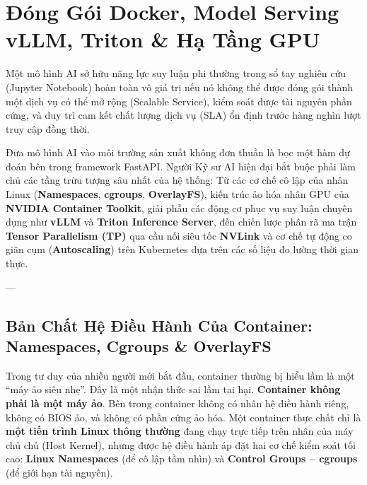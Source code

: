 
\chapter{Đóng Gói Docker, Model Serving vLLM, Triton \& Hạ Tầng GPU}
\label{ch:docker-serving-triton}

Một mô hình AI sở hữu năng lực suy luận phi thường trong sổ tay nghiên cứu (Jupyter Notebook) hoàn toàn vô giá trị nếu nó không thể được đóng gói thành một dịch vụ có thể mở rộng (Scalable Service), kiểm soát được tài nguyên phần cứng, và duy trì cam kết chất lượng dịch vụ (SLA) ổn định trước hàng nghìn lượt truy cập đồng thời.

Đưa mô hình AI vào môi trường sản xuất không đơn thuần là bọc một hàm dự đoán bên trong framework FastAPI. Người Kỹ sư AI hiện đại bắt buộc phải làm chủ các tầng trừu tượng sâu nhất của hệ thống: Từ các cơ chế cô lập của nhân Linux (\textbf{Namespaces}, \textbf{cgroups}, \textbf{OverlayFS}), kiến trúc ảo hóa nhân GPU của \textbf{NVIDIA Container Toolkit}, giải phẫu các động cơ phục vụ suy luận chuyên dụng như \textbf{vLLM} và \textbf{Triton Inference Server}, đến chiến lược phân rã ma trận \textbf{Tensor Parallelism (TP)} qua cầu nối siêu tốc \textbf{NVLink} và cơ chế tự động co giãn cụm (\textbf{Autoscaling}) trên Kubernetes dựa trên các số liệu đo lường thời gian thực.

---

\section{Bản Chất Hệ Điều Hành Của Container: Namespaces, Cgroups \& OverlayFS}
\label{sec:linux-container-internals}

Trong tư duy của nhiều người mới bắt đầu, container thường bị hiểu lầm là một ``máy ảo siêu nhẹ''. Đây là một nhận thức sai lầm tai hại. \textbf{Container không phải là một máy ảo}. Bên trong container không có nhân hệ điều hành riêng, không có BIOS ảo, và không có phần cứng ảo hóa. Một container thực chất chỉ là \textbf{một tiến trình Linux thông thường} đang chạy trực tiếp trên nhân của máy chủ chủ (Host Kernel), nhưng được hệ điều hành áp đặt hai cơ chế kiểm soát tối cao: \textbf{Linux Namespaces} (để cô lập tầm nhìn) và \textbf{Control Groups -- cgroups} (để giới hạn tài nguyên).


